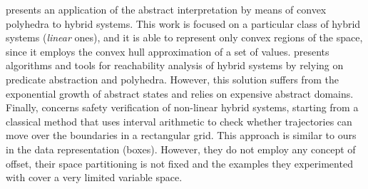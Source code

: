 \cite{HRP94} presents an application of the abstract interpretation by means of convex polyhedra to hybrid systems. This work is focused on a particular class of hybrid systems (\emph{linear} ones), and it is able to represent only convex regions of the space, since it employs the convex hull approximation of a set of values. \cite{ADI02} presents algorithms and tools for reachability analysis of hybrid systems by relying on predicate abstraction and polyhedra. However, this solution suffers from the exponential growth of abstract states and relies on expensive abstract domains. Finally, \cite{RS05} concerns safety verification of non-linear hybrid systems, starting from a classical method that uses interval arithmetic to check whether trajectories can move over the boundaries in a rectangular grid. This approach is similar to ours in the data representation (boxes). However, they do not employ any concept of offset, their space partitioning is not fixed and the examples they experimented with cover a very limited variable space.

